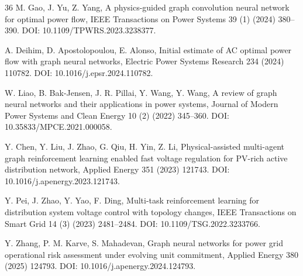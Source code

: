 \documentclass[preprint,review,12pt]{elsarticle}
\begin{document}
\begin{thebibliography}{36}
 M. Gao, J. Yu, Z. Yang, A physics-guided graph convolution neural network for optimal power flow, IEEE Transactions on Power Systems 39 (1) (2024) 380--390. DOI: 10.1109/TPWRS.2023.3238377.

 A. Deihim, D. Apostolopoulou, E. Alonso, Initial estimate of AC optimal power flow with graph neural networks, Electric Power Systems Research 234 (2024) 110782. DOI: 10.1016/j.epsr.2024.110782.

 W. Liao, B. Bak-Jensen, J. R. Pillai, Y. Wang, Y. Wang, A review of graph neural networks and their applications in power systems, Journal of Modern Power Systems and Clean Energy 10 (2) (2022) 345--360. DOI: 10.35833/MPCE.2021.000058.

 Y. Chen, Y. Liu, J. Zhao, G. Qiu, H. Yin, Z. Li, Physical-assisted multi-agent graph reinforcement learning enabled fast voltage regulation for PV-rich active distribution network, Applied Energy 351 (2023) 121743. DOI: 10.1016/j.apenergy.2023.121743.

 Y. Pei, J. Zhao, Y. Yao, F. Ding, Multi-task reinforcement learning for distribution system voltage control with topology changes, IEEE Transactions on Smart Grid 14 (3) (2023) 2481--2484. DOI: 10.1109/TSG.2022.3233766.

 Y. Zhang, P. M. Karve, S. Mahadevan, Graph neural networks for power grid operational risk assessment under evolving unit commitment, Applied Energy 380 (2025) 124793. DOI: 10.1016/j.apenergy.2024.124793.

\end{thebibliography}
\end{document}
